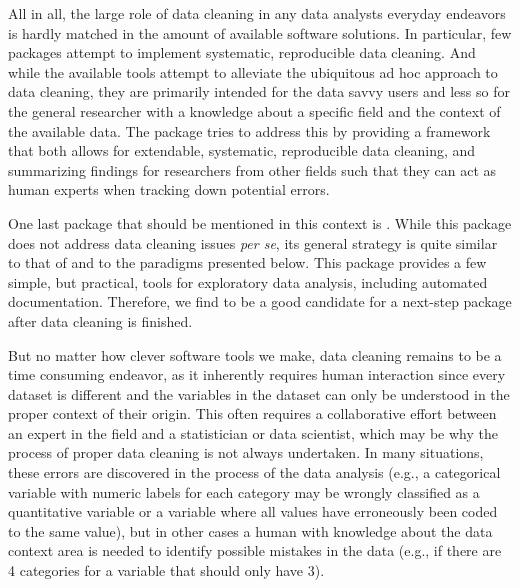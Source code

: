 \documentclass[article,shortnames]{jss}
\begin{document}
All in all, the large role of data cleaning in any data analysts
everyday endeavors is hardly matched in the amount of available
 software solutions. In particular, few packages attempt
to implement systematic, reproducible data cleaning. And while the
available tools attempt to alleviate the ubiquitous ad hoc approach to
data cleaning, they are primarily intended for the data savvy users
and less so for the general researcher with a knowledge about a
specific field and the context of the available data. The
 package \citep{dataMaid} tries to address this by
providing a framework that both allows for extendable, systematic,
reproducible data cleaning, and summarizing findings for researchers
from other fields such that they can act as human experts when
tracking down potential errors.


One last package that should be mentioned in this context is
 \citep{DataExplorer}. While this package does not
address data cleaning issues \emph{per se}, its general strategy is
quite similar to that of  and to the paradigms presented
below. This package provides a few simple, but practical, tools for
exploratory data analysis, including automated
documentation. Therefore, we find  to be a good
candidate for a next-step package after data cleaning is finished.

But no matter how clever software tools we make, data cleaning remains
to be a time consuming endeavor, as it inherently requires human
interaction since every dataset is different and the variables in the
dataset can only be understood in the proper context of their
origin. This often requires a collaborative effort between an expert
in the field and a statistician or data scientist, which may be why
the process of proper data cleaning is not always undertaken. In many
situations, these errors are discovered in the process of the data
analysis (e.g., a categorical variable with numeric labels for each
category may be wrongly classified as a quantitative variable or a
variable where all values have erroneously been coded to the same
value), but in other cases a human with knowledge about the data
context area is needed to identify possible mistakes in the data
(e.g., if there are 4 categories for a variable that should only have
3).
\end{document}
